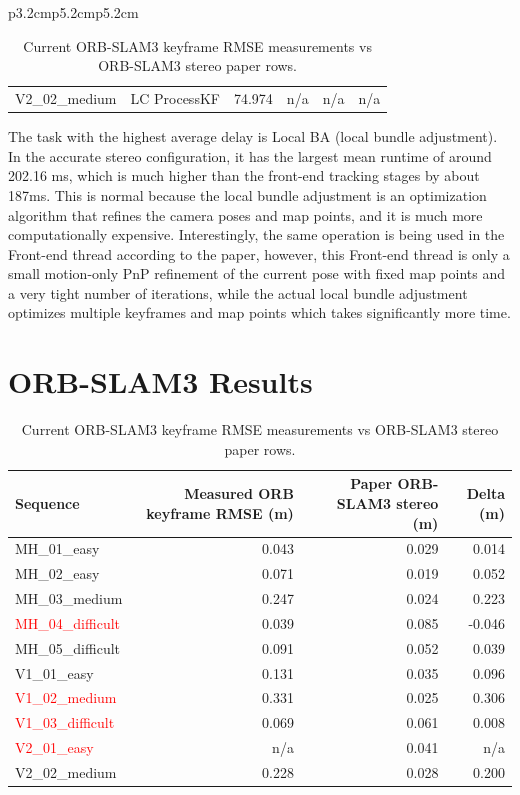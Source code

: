 \documentclass[11pt]{article}
\begin{document}
\begin{table}[ht]
\begin{tabular}{p{3.2cm}p{5.2cm}p{5.2cm}}
\begin{longtable}{llrrrr}
V2\_02\_medium & LC ProcessKF & 74.974 & n/a & n/a & n/a \\
\end{longtable}
The task with the highest average delay is Local BA (local bundle adjustment). In the accurate stereo configuration, it has the largest mean runtime of around 202.16 ms, which is much higher than the front-end tracking stages by about 187ms. This is normal because the local bundle adjustment is an optimization algorithm that refines the camera poses and map points, and it is much more computationally expensive. Interestingly, the same operation is being used in the Front-end thread according to the paper, however, this Front-end thread is only a small motion-only PnP refinement of the current pose with fixed map points and a very tight number of iterations, while the actual local bundle adjustment optimizes multiple keyframes and map points which takes significantly more time.
\clearpage

\section{ORB-SLAM3 Results}

\begin{table}[H]
\centering
\small
\caption{Current ORB-SLAM3 keyframe RMSE measurements vs ORB-SLAM3 stereo paper rows.}
\label{tab:orb_vs_paper_accuracy}
\begin{tabular}{lrrr}
\toprule
Sequence & Measured ORB keyframe RMSE (m) & Paper ORB-SLAM3 stereo (m) & Delta (m) \\
\midrule
MH\_01\_easy & 0.043 & 0.029 & 0.014 \\
MH\_02\_easy & 0.071 & 0.019 & 0.052 \\
MH\_03\_medium & 0.247 & 0.024 & 0.223 \\
\textcolor{red}{MH\_04\_difficult} & 0.039 & 0.085 & -0.046 \\
MH\_05\_difficult & 0.091 & 0.052 & 0.039 \\
V1\_01\_easy & 0.131 & 0.035 & 0.096 \\
\textcolor{red}{V1\_02\_medium} & 0.331 & 0.025 & 0.306 \\
\textcolor{red}{V1\_03\_difficult} & 0.069 & 0.061 & 0.008 \\
\textcolor{red}{V2\_01\_easy} & n/a & 0.041 & n/a \\
V2\_02\_medium & 0.228 & 0.028 & 0.200 \\
\bottomrule
\end{tabular}
\end{table}


\end{tabular}
\end{table}
\end{document}

